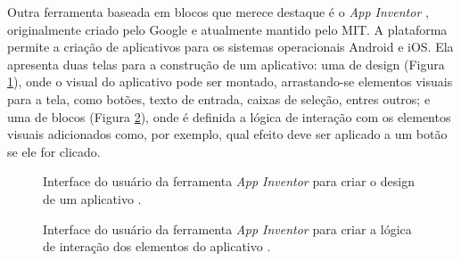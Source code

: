 Outra ferramenta baseada em blocos que merece destaque é o \textit{App Inventor} \citep{appinventor2024}, originalmente criado pelo Google e atualmente mantido pelo MIT. A plataforma permite a criação de aplicativos para os sistemas operacionais Android e iOS. Ela apresenta duas telas para a construção de um aplicativo: uma de design (Figura \ref{figure:app_inventor_design}), onde o visual do aplicativo pode ser montado, arrastando-se elementos visuais para a tela, como botões, texto de entrada, caixas de seleção, entres outros; e uma de blocos (Figura \ref{figure:app_inventor_logica}), onde é definida a lógica de interação com os elementos visuais adicionados como, por exemplo, qual efeito deve ser aplicado a um botão se ele for clicado.

\begin{figure}[t]
    \centering
    \setlength{\fboxrule}{0.1pt} %
    \caption{Interface do usuário da ferramenta \textit{App Inventor} para criar o design de um aplicativo \citep{appinventor2024}.}
    \label{figure:app_inventor_design}
\end{figure}

\begin{figure}[t]
    \centering
    \setlength{\fboxrule}{0.1pt} %
    \caption{Interface do usuário da ferramenta \textit{App Inventor} para criar a lógica de interação dos elementos do aplicativo \citep{appinventor2024}.}
    \label{figure:app_inventor_logica}
\end{figure}

